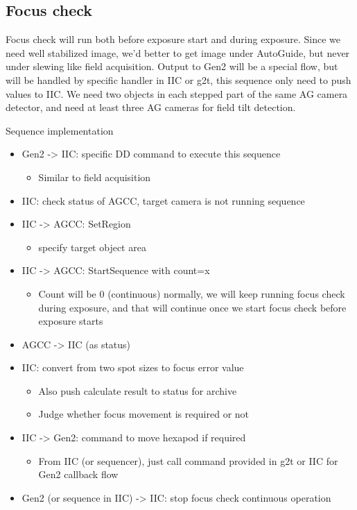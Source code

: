 \documentclass[a4paper,notitlepage]{article}
\begin{document}
\subsection{Focus check}

Focus check will run both before exposure start and during exposure. Since we need well stabilized image, we’d better to get image under AutoGuide, but never under slewing like field acquisition. Output to Gen2 will be a special flow, but will be handled by specific handler in IIC or g2t, this sequence only need to push values to IIC. 
We need two objects in each stepped part of the same AG camera detector, and need at least three AG cameras for field tilt detection.

Sequence implementation
\begin{itemize}
  \item Gen2 -> IIC: specific DD command to execute this sequence
  \begin{itemize}
    \item Similar to field acquisition
  \end{itemize}
  \item IIC: check status of AGCC, target camera is not running sequence
  \item IIC -> AGCC: SetRegion 
  \begin{itemize}
    \item specify target object area
  \end{itemize}
  \item IIC -> AGCC: StartSequence with count=x
  \begin{itemize}
    \item Count will be 0 (continuous) normally, we will keep running focus check during exposure, and that will continue once we start focus check before exposure starts
  \end{itemize}
  \item AGCC -> IIC (as status)
  \item IIC: convert from two spot sizes to focus error value
  \begin{itemize}
    \item Also push calculate result to status for archive
    \item Judge whether focus movement is required or not
  \end{itemize}
  \item IIC -> Gen2: command to move hexapod if required
  \begin{itemize}
    \item From IIC (or sequencer), just call command provided in g2t or IIC for Gen2 callback flow
  \end{itemize}
  \item Gen2 (or sequence in IIC) -> IIC: stop focus check continuous operation
\end{itemize}
\end{document}
